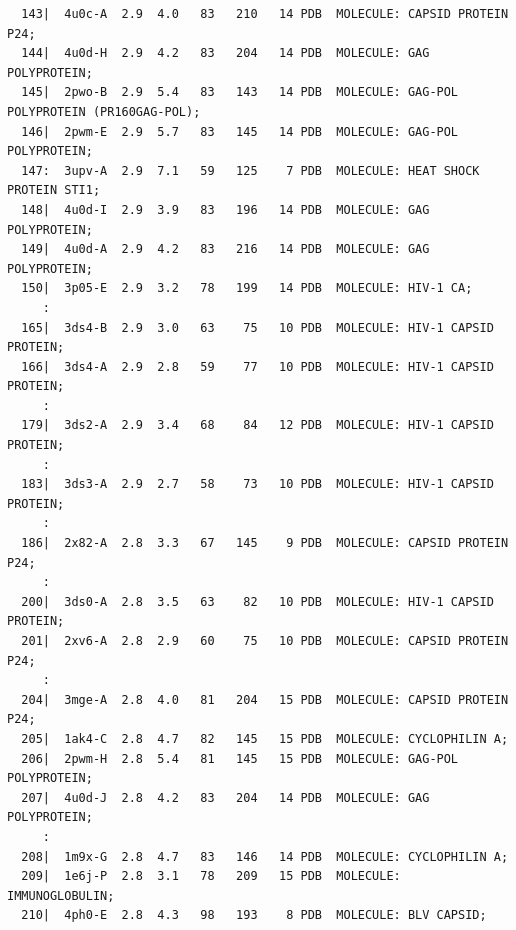 \documentclass{bmcart}
\begin{document}
\begin{verbatim}
  143|  4u0c-A  2.9  4.0   83   210   14 PDB  MOLECULE: CAPSID PROTEIN P24;                                        
  144|  4u0d-H  2.9  4.2   83   204   14 PDB  MOLECULE: GAG POLYPROTEIN;                                           
  145|  2pwo-B  2.9  5.4   83   143   14 PDB  MOLECULE: GAG-POL POLYPROTEIN (PR160GAG-POL);                        
  146|  2pwm-E  2.9  5.7   83   145   14 PDB  MOLECULE: GAG-POL POLYPROTEIN;                                       
  147:  3upv-A  2.9  7.1   59   125    7 PDB  MOLECULE: HEAT SHOCK PROTEIN STI1;                                   
  148|  4u0d-I  2.9  3.9   83   196   14 PDB  MOLECULE: GAG POLYPROTEIN;                                           
  149|  4u0d-A  2.9  4.2   83   216   14 PDB  MOLECULE: GAG POLYPROTEIN;                                           
  150|  3p05-E  2.9  3.2   78   199   14 PDB  MOLECULE: HIV-1 CA;                                                  
     :
  165|  3ds4-B  2.9  3.0   63    75   10 PDB  MOLECULE: HIV-1 CAPSID PROTEIN;                                      
  166|  3ds4-A  2.9  2.8   59    77   10 PDB  MOLECULE: HIV-1 CAPSID PROTEIN;                                      
     :
  179|  3ds2-A  2.9  3.4   68    84   12 PDB  MOLECULE: HIV-1 CAPSID PROTEIN;                                      
     :
  183|  3ds3-A  2.9  2.7   58    73   10 PDB  MOLECULE: HIV-1 CAPSID PROTEIN;                                      
     :
  186|  2x82-A  2.8  3.3   67   145    9 PDB  MOLECULE: CAPSID PROTEIN P24;                                        
     :
  200|  3ds0-A  2.8  3.5   63    82   10 PDB  MOLECULE: HIV-1 CAPSID PROTEIN;                                      
  201|  2xv6-A  2.8  2.9   60    75   10 PDB  MOLECULE: CAPSID PROTEIN P24;                                        
     :
  204|  3mge-A  2.8  4.0   81   204   15 PDB  MOLECULE: CAPSID PROTEIN P24;                                        
  205|  1ak4-C  2.8  4.7   82   145   15 PDB  MOLECULE: CYCLOPHILIN A;                                             
  206|  2pwm-H  2.8  5.4   81   145   15 PDB  MOLECULE: GAG-POL POLYPROTEIN;                                       
  207|  4u0d-J  2.8  4.2   83   204   14 PDB  MOLECULE: GAG POLYPROTEIN;                                           
     :
  208|  1m9x-G  2.8  4.7   83   146   14 PDB  MOLECULE: CYCLOPHILIN A;                                             
  209|  1e6j-P  2.8  3.1   78   209   15 PDB  MOLECULE: IMMUNOGLOBULIN;                                            
  210|  4ph0-E  2.8  4.3   98   193    8 PDB  MOLECULE: BLV CAPSID;                                                

\end{verbatim}
\end{document}
